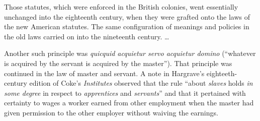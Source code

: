 \documentclass[
  letterpaper,
  11pt,
  DIV=9,
  openright]{scrbook}
\begin{document}
Those statutes, which were enforced in the British colonies, went
essentially unchanged into the eighteenth century, when they were
grafted onto the laws of the new American statutes. The same
configuration of meanings and policies in the old laws carried on into
the nineteenth century. \ldots{}


Another such principle was \emph{quicquid acquietur servo acquietur
domino} (``whatever is acquired by the servant is acquired by the
master''). That principle was continued in the law of master and
servant. A note in Hargrave's eighteeth-century edition of Coke's
\emph{Institutes} observed that the rule ``about \emph{slaves} holds
\emph{in some degree} in respect to \emph{apprentices} and
\emph{servants}'' and that it pertained with certainty to wages a worker
earned from other employment when the master had given permission to the
other employer without waiving the earnings.
\end{document}
